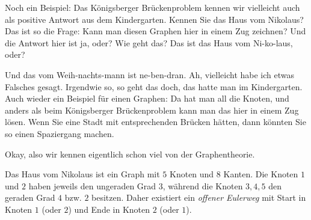 \begin{spoken-clean}[00:11:42 - 00:13:00]
Noch ein Beispiel: Das Königsberger Brückenproblem kennen wir vielleicht auch als positive Antwort aus dem Kindergarten. Kennen Sie das Haus vom Nikolaus? Das ist so die Frage: Kann man diesen Graphen hier in einem Zug zeichnen? Und die Antwort hier ist ja, oder? Wie geht das? Das ist das Haus vom Ni-ko-laus, oder?

Und das vom Weih-nachts-mann ist ne-ben-dran. Ah, vielleicht habe ich etwas Falsches gesagt. Irgendwie so, so geht das doch, das hatte man im Kindergarten. Auch wieder ein Beispiel für einen Graphen: Da hat man all die Knoten, und anders als beim Königsberger Brückenproblem kann man das hier in einem Zug lösen. Wenn Sie eine Stadt mit entsprechenden Brücken hätten, dann könnten Sie so einen Spaziergang machen.

Okay, also wir kennen eigentlich schon viel von der Graphentheorie.
\end{spoken-clean}

\begin{math-stroke}
\begin{center}
\end{center}

\begin{explanation-of-steps}
Das Haus vom Nikolaus ist ein Graph mit $5$ Knoten und $8$ Kanten. Die Knoten $1$ und $2$ haben jeweils den ungeraden Grad $3$, während die Knoten $3, 4, 5$ den geraden Grad $4$ bzw. $2$ besitzen. Daher existiert ein \emph{offener Eulerweg} mit Start in Knoten $1$ (oder $2$) und Ende in Knoten $2$ (oder $1$).
\end{explanation-of-steps}
\end{math-stroke}

